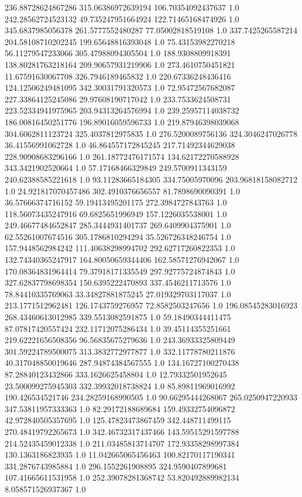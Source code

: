 236.88728624867286	315.06386972639194	106.70354092437637	1.0
242.28562724523132	49.735247951664924	122.71465168474926	1.0
345.6837985056378	261.5777552480287	77.05002818519108	1.0
337.7425265587214	204.58108710202245	199.65648816393048	1.0
75.43153982270218	56.11279547233066	305.47988094305504	1.0
188.9308809918391	138.80281763218164	209.90657931219906	1.0
273.4610750451821	11.67591630067708	326.7946189465832	1.0
220.67336248436416	124.12506249481095	342.30031791320573	1.0
72.95472567682087	227.33864125245086	29.97608190717042	1.0
233.7533624508731	223.52334941975965	203.94313264576994	1.0
239.25957114038732	186.00816450251776	196.89016059596733	1.0
219.87946398039068	304.6062811123724	325.4037812975835	1.0
276.5200089756136	324.3046247026778	36.41556991062728	1.0
46.864557172845245	217.71492344629038	228.90908683296166	1.0
261.18772476171574	134.62172270588928	343.3421902520664	1.0
57.17168466329849	249.5700911343159	240.62388585221618	1.0
93.11283665184305	334.75005970096	203.96818158082712	1.0
24.921817070457486	302.4910376656557	81.7898690090391	1.0
36.57666374716152	59.19413495201175	272.3984727843763	1.0
118.56073435247916	69.6825651996949	157.1226035538001	1.0
249.46677484652847	285.3444931401737	269.6409904375901	1.0
62.55261007674516	305.1786810294294	35.526726348246754	1.0
157.9448562984242	111.40638298994702	292.62717260822353	1.0
132.74340365247917	164.80050659344406	162.58571276942067	1.0
170.08364831964414	79.37918171335549	297.92775724874843	1.0
327.62837798698354	150.6395222470893	337.4546211713576	1.0
78.84410335769063	33.34827881875245	27.019329703117037	1.0
213.1771512962481	126.1743759276957	72.8582503247656	1.0
196.08545283016923	268.43460613012985	339.5513082591875	1.0
59.18490344411475	87.07817420557424	232.11712075286434	1.0
39.45114355251661	219.62221656508356	96.56835675279636	1.0
243.36933325809449	301.59224789500075	313.3832772977877	1.0
332.11778780211876	40.317048850019646	287.94874384567555	1.0
134.16727100270438	87.28840123432866	333.1626625458804	1.0
12.79332501952645	23.500099275945303	332.39932018738824	1.0
85.89811969016992	190.426534521746	234.28259168990505	1.0
90.66295444268067	265.0250947220933	347.53811957333363	1.0
82.29172188689684	159.49332754096872	42.972840505357695	1.0
125.47823473867459	342.448711499115	270.48419792265673	1.0
342.46732317437466	143.59515291597788	214.52435459012338	1.0
211.03485813714707	172.93358298997384	130.1363186823935	1.0
11.042665065456463	100.82170117190341	331.2876743985884	1.0
296.1552261908895	324.9590407899681	107.41665611531958	1.0
252.39078281368742	53.820492889982134	8.058571526937367	1.0
